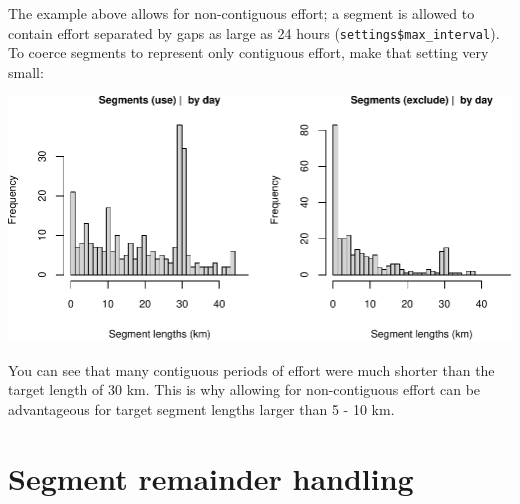 \documentclass[
]{book}
\newenvironment{Shaded}{\begin{snugshade}}{\end{snugshade}}
\newcommand{\CommentTok}[1]{\textcolor[rgb]{0.56,0.35,0.01}{\textit{#1}}}
\newcommand{\DataTypeTok}[1]{\textcolor[rgb]{0.13,0.29,0.53}{#1}}
\newcommand{\DecValTok}[1]{\textcolor[rgb]{0.00,0.00,0.81}{#1}}
\newcommand{\FloatTok}[1]{\textcolor[rgb]{0.00,0.00,0.81}{#1}}
\newcommand{\KeywordTok}[1]{\textcolor[rgb]{0.13,0.29,0.53}{\textbf{#1}}}
\newcommand{\NormalTok}[1]{#1}
\newcommand{\OperatorTok}[1]{\textcolor[rgb]{0.81,0.36,0.00}{\textbf{#1}}}
\newcommand{\OtherTok}[1]{\textcolor[rgb]{0.56,0.35,0.01}{#1}}
\newcommand{\StringTok}[1]{\textcolor[rgb]{0.31,0.60,0.02}{#1}}
\begin{document}
The example above allows for non-contiguous effort; a segment is allowed to contain effort separated by gaps as large as 24 hours (\texttt{settings\$max\_interval}). To coerce segments to represent only contiguous effort, make that setting very small:

\begin{Shaded}
\end{Shaded}

\includegraphics{figures/unnamed-chunk-106-1.pdf}

You can see that many contiguous periods of effort were much shorter than the target length of 30 km. This is why allowing for non-contiguous effort can be advantageous for target segment lengths larger than 5 - 10 km.

\hypertarget{segment-remainder-handling}{%
\section*{Segment remainder handling}\label{segment-remainder-handling}}
\end{document}
